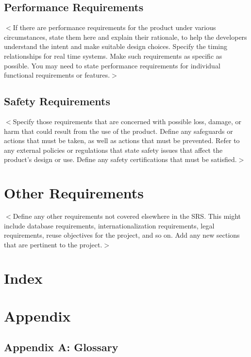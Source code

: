\documentclass[draftclsnofoot,onecolumn,10pt]{IEEEtran}
\begin{document}
\begin{enumerate}
\subsection{Performance Requirements}
$<$If there are performance requirements for the product under various 
circumstances, state them here and explain their rationale, to help the 
developers understand the intent and make suitable design choices. Specify the 
timing relationships for real time systems. Make such requirements as specific 
as possible. You may need to state performance requirements for individual 
functional requirements or features.$>$

\subsection{Safety Requirements}
$<$Specify those requirements that are concerned with possible loss, damage, or 
harm that could result from the use of the product. Define any safeguards or 
actions that must be taken, as well as actions that must be prevented. Refer to 
any external policies or regulations that state safety issues that affect the 
product’s design or use. Define any safety certifications that must be 
satisfied.$>$

\section{Other Requirements}
$<$Define any other requirements not covered elsewhere in the SRS. This might 
include database requirements, internationalization requirements, legal 
requirements, reuse objectives for the project, and so on. Add any new sections 
that are pertinent to the project.$>$

\section{Index}

\section{Appendix}

\subsection{Appendix A: Glossary}


\end{enumerate}
\end{document}
